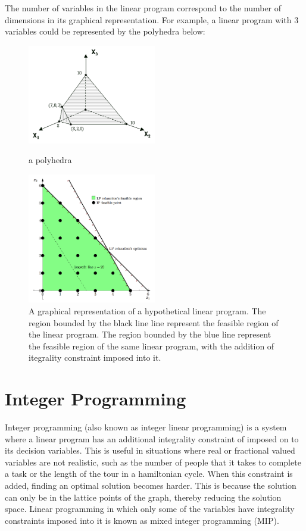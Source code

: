\documentclass[a4paper, 12pt]{report}
\begin{document}
The number of variables in the linear program correspond to the number of dimensions in its graphical representation. For example,
a linear program with 3 variables could be represented by the polyhedra below:

\begin{figure}[!ht]
  \centering
    \includegraphics[width=0.5\textwidth]{polyhedra2.png}
    \caption{a polyhedra}
    \vspace{1cm}
    \includegraphics[width=0.5\textwidth]{ipfeasible.png}
    \caption{A graphical representation of a hypothetical linear program. The region bounded by the black line
  line represent the feasible region of the linear program. The region bounded by the blue line represent
   the feasible region of the same linear program, with the addition of itegrality constraint imposed into it.}
\end{figure}

\section{Integer Programming}
Integer programming (also known as integer linear programming) is a system where a linear program has an additional
integrality constraint of imposed on to its decision variables. This is useful in situations where real or
fractional valued variables are not realistic, such as the number of people that it takes to complete a task or the
length of the tour in a hamiltonian cycle.
When this constraint is added, finding an optimal solution becomes harder. This is because the solution can only be
in the lattice points of the graph, thereby
reducing the solution space. Linear programming in which only some of the variables have integrality constraints imposed
into it is known as mixed integer programming (MIP).
\end{document}
